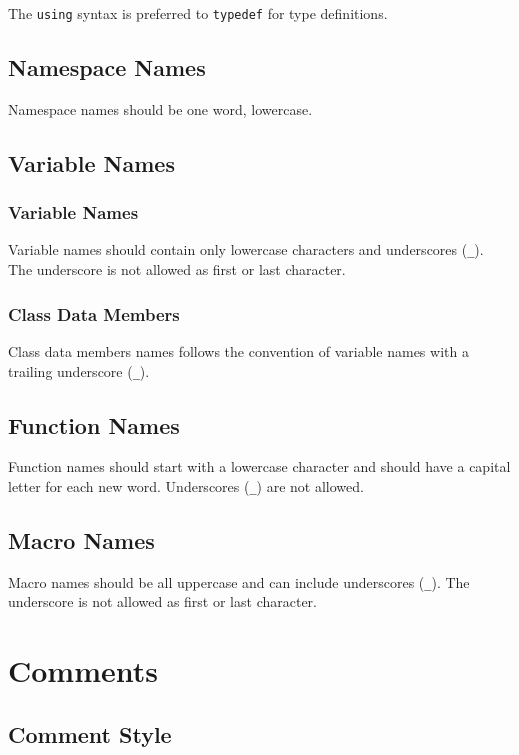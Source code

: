 \documentclass[a4paper]{article}
\newcommand{\inlinecode}[1]{\lstinline|#1|}
\begin{document}
The \inlinecode{using} syntax is preferred to \inlinecode{typedef} for type definitions.

\subsection{Namespace Names}

Namespace names should be one word, lowercase.

\subsection{Variable Names}

\subsubsection{Variable Names}

Variable names should contain only lowercase characters and underscores (\inlinecode{_}). The underscore is not allowed as first or last character.

\subsubsection{Class Data Members}

Class data members names follows the convention of variable names with a trailing underscore (\inlinecode{_}).

\subsection{Function Names}

Function names should start with a lowercase character and should have a capital letter for each new word. Underscores (\inlinecode{_}) are not allowed.

\subsection{Macro Names}

Macro names should be all uppercase and can include underscores (\inlinecode{_}). The underscore is not allowed as first or last character.

\section{Comments}

\subsection{Comment Style}
\end{document}
